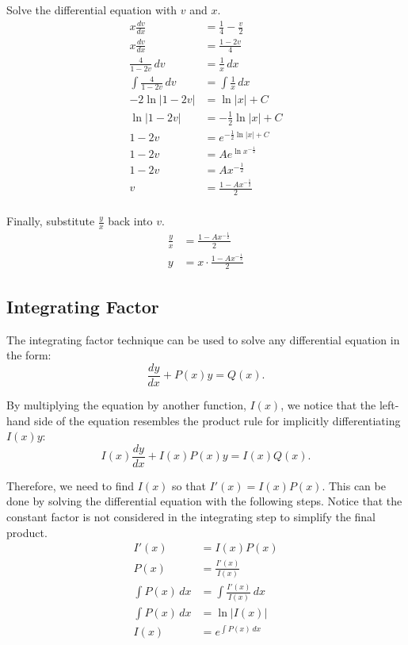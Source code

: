 \documentclass[12pt]{article}
\begin{document}
Solve the differential equation with $v$ and $x$.
\begin{align*}
    x \frac{dv}{dx}             & = \frac{1}{4} - \frac{v}{2}        \\[6pt]
    x \frac{dv}{dx}             & = \frac{1 - 2v}{4}                 \\[6pt]
    \frac{4}{1 - 2v} \, dv      & = \frac{1}{x} \, dx                \\[6pt]
    \int \frac{4}{1 - 2v} \, dv & = \int \frac{1}{x} \, dx           \\[6pt]
    -2 \ln|1 - 2v|              & = \ln|x| + C                       \\
    \ln|1 - 2v|                 & = -\frac{1}{2} \ln|x| + C          \\[6pt]
    1 - 2v                      & = e^{-\frac{1}{2} \ln|x| + C}      \\[6pt]
    1 - 2v                      & = A e^{\ln x^{-\frac{1}{2}}}       \\[6pt]
    1 - 2v                      & = A x^{-\frac{1}{2}}               \\[6pt]
    v                           & = \frac{1 - A x^{-\frac{1}{2}}}{2} \\[6pt]
\end{align*}

Finally, substitute $\frac{y}{x}$ back into $v$.
\begin{align*}
    \frac{y}{x} & = \frac{1 - A x^{-\frac{1}{2}}}{2}         \\[6pt]
    y           & = x \cdot \frac{1 - A x^{-\frac{1}{2}}}{2}
\end{align*}

\subsection{Integrating Factor}
The integrating factor technique can be used to solve any differential equation in the form:
\[ \frac{dy}{dx} + P(x)y = Q(x). \]

By multiplying the equation by another function, $I(x)$, we notice that the left-hand side of the equation resembles the product rule for implicitly differentiating $I(x) y$:
\[ I(x) \frac{dy}{dx} + I(x) P(x)y = I(x) Q(x). \]

Therefore, we need to find $I(x)$ so that $I'(x) = I(x) P(x)$. This can be done by solving the differential equation with the following steps. Notice that the constant factor is not considered in the integrating step to simplify the final product.
\begin{align*}
    I'(x)           & = I(x) P(x)                     \\
    P(x)            & = \frac{I'(x)}{I(x)}            \\[6pt]
    \int P(x) \, dx & = \int \frac{I'(x)}{I(x)} \, dx \\[6pt]
    \int P(x) \, dx & = \ln|I(x)|                     \\
    I(x)            & = e^{\int P(x) \, dx}
\end{align*}
\end{document}
